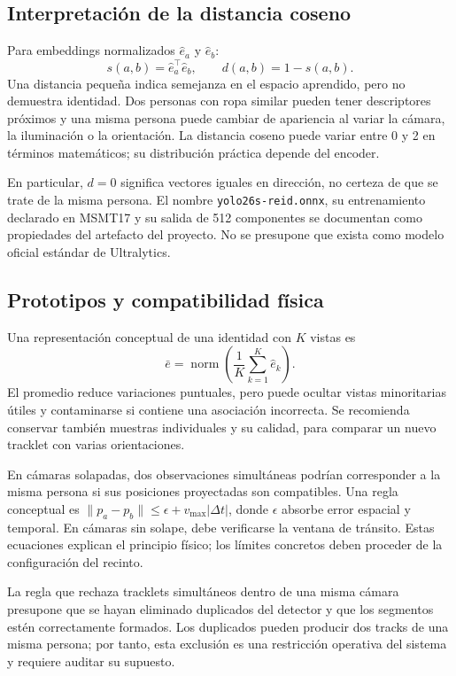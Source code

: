 \documentclass[12pt,letterpaper]{article}
\begin{document}
\subsection{Interpretación de la distancia coseno}
Para embeddings normalizados $\hat{e}_a$ y $\hat{e}_b$:
\begin{equation}
 s(a,b)=\hat{e}_a^\top\hat{e}_b,\qquad d(a,b)=1-s(a,b).
\end{equation}
Una distancia pequeña indica semejanza en el espacio aprendido, pero no demuestra identidad. Dos personas con ropa similar pueden tener descriptores próximos y una misma persona puede cambiar de apariencia al variar la cámara, la iluminación o la orientación. La distancia coseno puede variar entre 0 y 2 en términos matemáticos; su distribución práctica depende del encoder.

En particular, $d=0$ significa vectores iguales en dirección, no certeza de que se trate de la misma persona. El nombre \texttt{yolo26s-reid.onnx}, su entrenamiento declarado en MSMT17 y su salida de 512 componentes se documentan como propiedades del artefacto del proyecto. No se presupone que exista como modelo oficial estándar de Ultralytics.

\subsection{Prototipos y compatibilidad física}
Una representación conceptual de una identidad con $K$ vistas es
\begin{equation}
 \bar e=\operatorname{norm}\left(\frac{1}{K}\sum_{k=1}^K\hat e_k\right).
\end{equation}
El promedio reduce variaciones puntuales, pero puede ocultar vistas minoritarias útiles y contaminarse si contiene una asociación incorrecta. Se recomienda conservar también muestras individuales y su calidad, para comparar un nuevo tracklet con varias orientaciones.

En cámaras solapadas, dos observaciones simultáneas podrían corresponder a la misma persona si sus posiciones proyectadas son compatibles. Una regla conceptual es $\|p_a-p_b\|\leq\epsilon+v_{\max}|\Delta t|$, donde $\epsilon$ absorbe error espacial y temporal. En cámaras sin solape, debe verificarse la ventana de tránsito. Estas ecuaciones explican el principio físico; los límites concretos deben proceder de la configuración del recinto.

La regla que rechaza tracklets simultáneos dentro de una misma cámara presupone que se hayan eliminado duplicados del detector y que los segmentos estén correctamente formados. Los duplicados pueden producir dos tracks de una misma persona; por tanto, esta exclusión es una restricción operativa del sistema y requiere auditar su supuesto.
\end{document}
